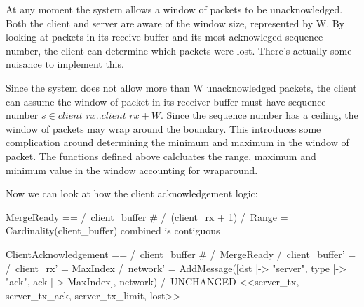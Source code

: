 At any moment the system allows a window of packets to be unacknowledged. Both
the client and server are aware of the window size, represented by W. By looking
at packets in its receive buffer and its most acknowleged sequence number, the
client can determine which packets were lost. There's actually some nuisance 
to implement this.\newline

Since the system does not allow more than W unacknowledged packets, the client
can assume the window of packet in its receiver buffer must have sequence number
$s \in client\_rx ..client\_rx+W$. Since the sequence number has a ceiling, the
window of packets may wrap around the boundary. This introduces some
complication around determining the minimum and maximum in the window of packet.
The functions defined above calcluates the range, maximum and minimum value in
the window accounting for wraparound.\newline

Now we can look at how the client acknowledgement logic:\newline
\begin{tla}
MergeReady == 
    /\ client_buffer # {}
    /\ (client_rx + 1) %
    /\ Range = Cardinality(client_buffer)   \* combined is contiguous 

ClientAcknowledgement == 
    /\ client_buffer # {}
    /\ MergeReady 
    /\ client_buffer' = {}
    /\ client_rx' = MaxIndex
    /\ network' = AddMessage([dst |-> "server",
                              type |-> "ack",
                              ack |-> MaxIndex], 
                                network)
    /\ UNCHANGED <<server_tx, server_tx_ack, server_tx_limit, lost>>
\end{tla}
\begin{tlatex}
%
%
%
\@xx{}%
%
%
\@xx{}%
\@pvspace{8.0pt}%
%
%
%
%
%
 \@x{\@s{16.4} \.{\land} network \.{'} \.{=} AddMessage ( [ dst
 \.{\mapsto}\@w{server} ,\,}%
%
\@x{\@s{16.4} ack \.{\mapsto} MaxIndex ] ,\,}%
%
\end{tlatex}
\newline

